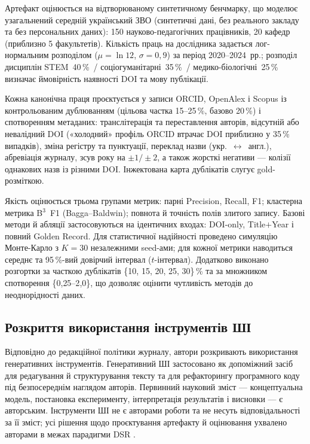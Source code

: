 Артефакт оцінюється на відтворюваному синтетичному бенчмарку, що моделює узагальнений середній український ЗВО (синтетичні дані, без реального закладу та без персональних даних): 150 науково-педагогічних працівників, 20 кафедр (приблизно 5 факультетів). Кількість праць на дослідника задається лог-нормальним розподілом ($\mu=\ln 12$, $\sigma=0{,}9$) за період 2020--2024~рр.; розподіл дисциплін STEM~40\,\%~/ соціогуманітарні~35\,\%~/ медико-біологічні~25\,\% визначає ймовірність наявності DOI та мову публікації.

Кожна канонічна праця проєктується у записи ORCID, OpenAlex і Scopus із контрольованим дублюванням (цільова частка 15--25\,\%, базово 20\,\%) і спотворенням метаданих: транслітерація та переставлення авторів, відсутній або невалідний DOI («холодний» профіль ORCID втрачає DOI приблизно у 35\,\% випадків), зміна регістру та пунктуації, переклад назви (укр.~$\leftrightarrow$~англ.), абревіація журналу, зсув року на $\pm 1/\pm 2$, а також жорсткі негативи — колізії однакових назв із різними DOI. Інжектована карта дублікатів слугує gold-розміткою.

Якість оцінюється трьома групами метрик: парні Precision, Recall, F1; кластерна метрика B$^3$~F1 (Bagga--Baldwin); повнота й точність полів злитого запису. Базові методи й абляції застосовуються на ідентичних входах: DOI-only, Title$+$Year і повний Golden Record. Для статистичної надійності проведено симуляцію Монте-Карло з $K=30$ незалежними seed-ами; для кожної метрики наводиться середнє та 95\,\%-вий довірчий інтервал ($t$-інтервал). Додатково виконано розгортки за часткою дублікатів \{10, 15, 20, 25, 30\}\,\% та за множником спотворення \{0{,}25--2{,}0\}, що дозволяє оцінити чутливість методів до неоднорідності даних.

\subsection*{Розкриття використання інструментів ШІ}

Відповідно до редакційної політики журналу, автори розкривають використання генеративних інструментів. Генеративний ШІ застосовано як допоміжний засіб для редагування й структурування тексту та для рефакторингу програмного коду під безпосереднім наглядом авторів. Первинний науковий зміст — концептуальна модель, постановка експерименту, інтерпретація результатів і висновки — є авторським. Інструменти ШІ не є авторами роботи та не несуть відповідальності за її зміст; усі рішення щодо проєктування артефакту й оцінювання ухвалено авторами в межах парадигми DSR \cite{Hevner2004DSR,Peffers2007DSRMeth}.